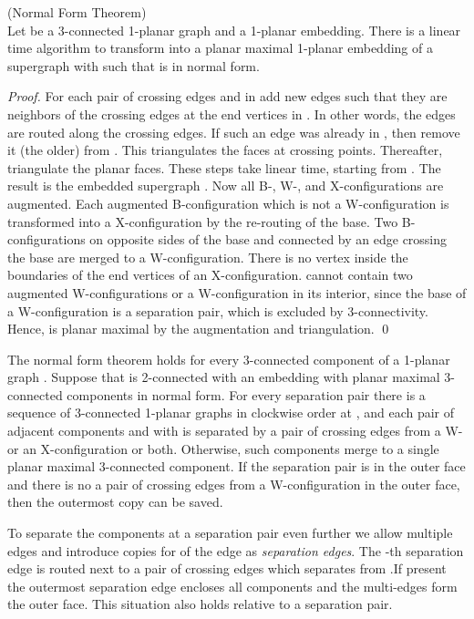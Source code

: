 \documentclass[runningheads]{llncs}
\begin{document}
\begin{proposition} (Normal Form Theorem) \cite{abk-sld3c-13} \\
Let  be a 3-connected 1-planar graph and 
a 1-planar embedding. There is a linear time algorithm to  transform
  into a planar maximal 1-planar embedding of a supergraph
  with  such that
 is in normal form.
\end{proposition}
\begin{proof}
For each pair of crossing edges  and  in
  add new edges 
such that they are neighbors of the crossing edges at the end
vertices in  . In other words, the edges are routed
along the crossing edges. If such an edge was already in , then
remove it (the older) from . This triangulates the
faces at crossing points. Thereafter, triangulate the planar faces.
These steps take  linear time, starting from . The
result is the embedded supergraph . Now all B-, W-, and
X-configurations are augmented. Each augmented B-configuration which
is not a W-configuration is transformed into a X-configuration by
the re-routing of the base. Two B-configurations on opposite sides
of the base and connected by an edge crossing the base are merged to
a W-configuration. There is no vertex inside the boundaries of the
end vertices of an X-configuration.  cannot contain
two augmented W-configurations or a W-configuration in its interior,
since the base of a W-configuration is a separation pair, which is
excluded by 3-connectivity. Hence,  is planar
maximal by the augmentation and triangulation.
 \qed
\end{proof}

The normal form theorem holds for every 3-connected component of a
1-planar graph . Suppose that   is 2-connected with an
embedding  with planar maximal 3-connected
components in normal form. For every separation pair 
there is a sequence of 3-connected 1-planar graphs  in clockwise order at , and each pair of adjacent
components  and  with  is separated
by a pair of crossing edges from a W- or an X-configuration or both.
Otherwise, such components merge to a single planar maximal
3-connected component. If the separation pair is in the outer face
and there is no a pair of crossing edges from a W-configuration in
the outer face, then the outermost copy  can be saved.

To separate the components at a separation pair  even
further we allow multiple edges and introduce copies  for  of the edge   as \emph{separation edges}.
The -th separation edge  is routed next to a pair of
crossing edges which separates  from .If present the
outermost separation edge  encloses all components and the
multi-edges  form the outer face. This situation also
holds relative to a separation pair.
\end{document}

